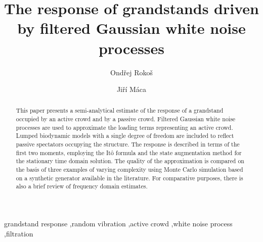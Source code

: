 \documentclass[preprint,12pt,authoryear]{elsarticle}
\begin{document}
	
\begin{frontmatter}
		




\title{The response of grandstands driven by filtered Gaussian white noise processes}



\author[affiliation1]{Ond\v{r}ej Roko\v{s}}

\author[affiliation1]{Ji\v{r}\'{i} M\'{a}ca}
		
\address[affiliation1]{Department of Mechanics, Faculty of Civil Engineering, Czech Technical University in Prague, Th\'{a}kurova~7, 166~29 Prague~6, Czech Republic.}
		
\begin{abstract}
This paper presents a semi-analytical estimate of the response of a grandstand occupied by an active crowd and by a passive crowd. Filtered Gaussian white noise processes are used to approximate the loading terms representing an active crowd. Lumped biodynamic models with a single degree of freedom are included to reflect passive spectators occupying the structure. The response is described in terms of the first two moments, employing the It\^{o} formula and the state augmentation method for the stationary time domain solution. The quality of the approximation is compared on the basis of three examples of varying complexity using Monte Carlo simulation based on a synthetic generator available in the literature. For comparative purposes, there is also a brief review of frequency domain estimates.
\end{abstract}
		
\begin{keyword}
grandstand response \sep random vibration \sep active crowd \sep white noise process \sep filtration




\end{keyword}
		
\end{frontmatter}
	
\end{document}
